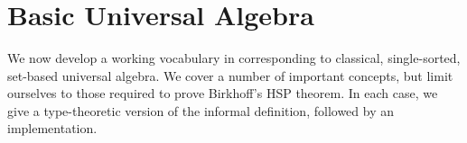 \ifshort\else
\begin{code}%
\>[0]\AgdaSpace{}%
\AgdaModule{\AgdaUnderscore{}}\AgdaSpace{}%
\AgdaSymbol{\{}\AgdaSpace{}%
\AgdaSymbol{:}\AgdaSpace{}%
\AgdaSpace{}%
\AgdaSpace{}%
\AgdaSymbol{\}\{}\AgdaSpace{}%
\AgdaSymbol{:}\AgdaSpace{}%
\AgdaSpace{}%
\AgdaSpace{}%
\AgdaSymbol{\}}\AgdaSpace{}%
\<%
\\
\>[0][@{}l@{\AgdaIndent{0}}]%
\>[1]\AgdaSpace{}%
\AgdaSpace{}%
\AgdaSpace{}%
\AgdaSpace{}%
\AgdaSymbol{()}\AgdaSpace{}%
\AgdaSpace{}%
\AgdaSymbol{(}\AgdaSpace{}%
\AgdaSpace{}%
\AgdaSpace{}%
\AgdaSpace{}%
\AgdaSymbol{)}\<%
\end{code}
\fi
\begin{code}%
\>[0]\<%
\\
%
\>[1]\AgdaSpace{}%
\AgdaSymbol{:}\AgdaSpace{}%
\AgdaSymbol{(}\AgdaSpace{}%
\AgdaSpace{}%
\AgdaSymbol{)}\AgdaSpace{}%
\AgdaSpace{}%
\AgdaSpace{}%
\AgdaSymbol{(}\AgdaSpace{}%
\AgdaSpace{}%
\AgdaSymbol{)}\AgdaSpace{}%
\<%
\\
%
\>[1]\AgdaSpace{}%
\AgdaSpace{}%
\AgdaSymbol{(}\AgdaSpace{}%
\AgdaOperator{\AgdaInductiveConstructor{,}}\AgdaSpace{}%
\AgdaSymbol{)}\AgdaSpace{}%
\AgdaSymbol{=}\AgdaSpace{}%
\AgdaSpace{}%
\AgdaSpace{}%
\AgdaSpace{}%
\AgdaSpace{}%
\AgdaSpace{}%
\AgdaSpace{}%
\AgdaSpace{}%
\AgdaSpace{}%
\AgdaSpace{}%
\AgdaSpace{}%
\AgdaSpace{}%
\AgdaSpace{}%
\AgdaSymbol{(}\AgdaSpace{}%
\AgdaSpace{}%
\AgdaSymbol{)}\<%
\end{code}



\section{Basic Universal Algebra}
\label{basic-universal-algebra}
We now develop a working vocabulary in \mltt corresponding to classical,
single-sorted, set-based universal algebra.
We cover a number of important concepts, but limit ourselves to those
required to prove Birkhoff's HSP theorem.
In each case, we give a type-theoretic version of the informal definition,
followed by an \agda implementation.

